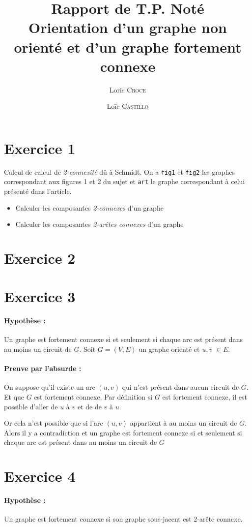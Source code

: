 \documentclass[11pt, a4paper]{article}
\author{Loris \textsc{Croce}\and Loïc \textsc{Castillo}}
\title{
	Rapport de T.P. Noté\\
	Orientation d'un graphe non orienté et d'un graphe fortement connexe
}
\date{}
\begin{document}
\maketitle

\section*{Exercice 1}
Calcul de calcul de \emph{2-connexité} dû à Schmidt. On a \verb|fig1| et \verb|fig2| les graphes correspondant aux figures 1 et 2 du sujet et \verb|art| le graphe correspondant à celui présenté dans l'article.
\begin{itemize}
\item Calculer les composantes \emph{2-connexes} d'un graphe


\item Calculer les composantes \emph{2-arêtes connexes} d'un graphe
\end{itemize}
\section*{Exercice 2}

\section*{Exercice 3}

\paragraph{Hypothèse :}Un graphe est fortement connexe si et seulement si chaque arc est présent dans au moins un circuit de $G$. Soit $G=(V,E)$ un graphe orienté et $u,v$ $\in E$.
\paragraph{Preuve par l'absurde :}On suppose qu'il existe un arc $(u,v)$ qui n'est présent dans aucun circuit de $G$. Et que $G$ est fortement connexe.
Par définition si $G$ est fortement connexe, il est possible d'aller de $u$ à $v$ et de de $v$ à $u$.

Or cela n'est possible que si l'arc $(u,v)$ appartient à au moins un circuit de $G$. Alors il y a contradiction et un graphe est fortement connexe si et seulement si chaque arc est présent dans au moins un circuit de $G$ 


\section*{Exercice 4}

\paragraph{Hypothèse :}Un graphe est fortement connexe si son graphe sous-jacent est 2-arête connexe. 
\end{document}

